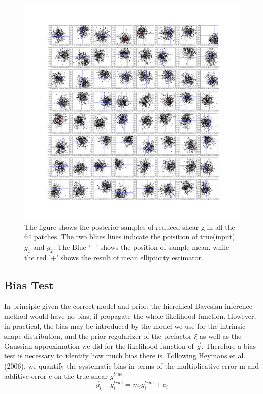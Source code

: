 \documentclass[useAMS,usenatbib]{mn2e}
\begin{document}
\begin{figure}
\end{figure}
\begin{figure}
\includegraphics[scale=0.15]{fig/test10}

\caption{The figure shows the posterior samples of reduced shear g
in all the 64 patches. The two blues lines indicate the poisition of
true(input) $g_{1}$ and $g_{2}$. The Blue '+' shows the position
of sample mean, while the red '+' shows the result of mean ellipticity
estimator.}
\end{figure}

\subsection{Bias Test}
In principle given the correct model and prior,
the hierchical Bayesian inference method would have no bias, if propagate the whole likelihood function.
However, in practical, the bias may be introduced by the model we use for the intrinsic shape distribution,
and the prior regularizer of the prefactor $\xi$ as well as the Gaussian approximation we did for the likelihood
function of $\vec{g}$. Therefore a bias test is necessary to identify how much bias there is. 
Following Heymans et al. (2006), we quantify the systematic bias 
in terms of the multiplicative error m and additive error c on the
true shear $g^{true}$ 
\begin{equation}
\hat{g_{i}}-g_{i}^{true}=m_{i}g_{i}^{true}+c_{i}
\end{equation}
\end{document}
